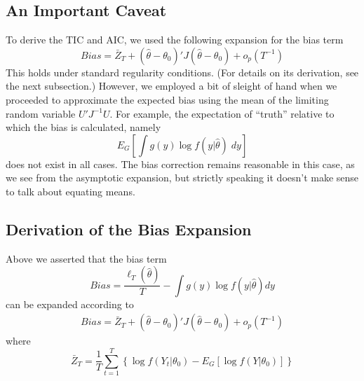 \documentclass[12pt]{article}
\theoremstyle{definition}
\begin{document}
\subsection{An Important Caveat}
To derive the TIC and AIC, we used the following expansion for the bias term
$$Bias = \bar{Z}_T + (\widehat{\theta} - \theta_0)' J (\widehat{\theta} - \theta_0) + o_p(T^{-1})$$
This holds under standard regularity conditions.
(For details on its derivation, see the next subsection.) However, we employed a bit of sleight of hand when we proceeded to approximate the expected bias using the mean of the limiting random variable $U'J^{-1}U$. For example, the expectation of ``truth'' relative to which the bias is calculated, namely
	$$E_G\left[\int g(y) \log f(y|\widehat{\theta})\; dy\right]$$
does not exist in all cases. The bias correction remains reasonable in this case, as we see from the asymptotic expansion, but strictly speaking it doesn't make sense to talk about equating means.

\subsection{Derivation of the Bias Expansion}
Above we asserted that the bias term
$$Bias = \frac{\ell_T(\widehat{\theta})}{T} - \int g(y) \log f(y|\widehat{\theta}) dy$$
can be expanded according to
\begin{eqnarray*}
	Bias = \bar{Z}_T + (\widehat{\theta} - \theta_0)' J (\widehat{\theta} - \theta_0) + o_p(T^{-1})
\end{eqnarray*}
where
$$\bar{Z}_T = \frac{1}{T} \sum_{t=1}^T\left\{ \log f(Y_t|\theta_0) - E_G[\log f(Y|\theta_0)] \right\}$$
\end{document}
